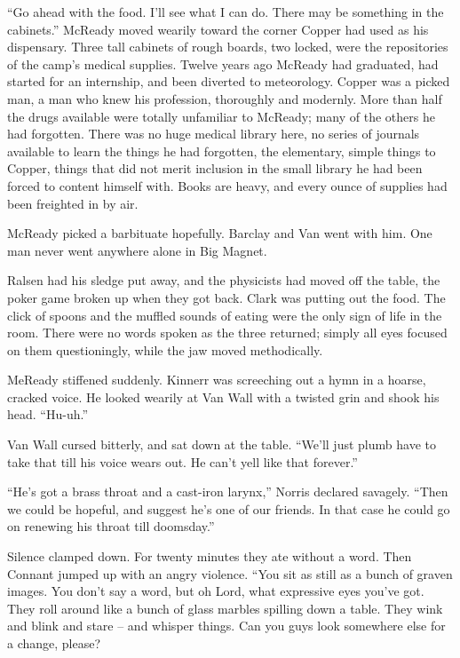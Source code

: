 \documentclass[letterpaper,openany,12pt]{memoir}		%
\begin{document}
``Go ahead with the food. I'll see what I can do. There may be something in the
cabinets.'' McReady moved wearily toward the corner Copper had used as his
dispensary. Three tall cabinets of rough boards, two locked, were the
repositories of the camp's medical supplies. Twelve years ago McReady had
graduated, had started for an internship, and been diverted to meteorology.
Copper was a picked man, a man who knew his profession, thoroughly and modernly.
More than half the drugs available were totally unfamiliar to McReady; many of
the others he had forgotten. There was no huge medical library here, no series
of journals available to learn the things he had forgotten, the elementary,
simple things to Copper, things that did not merit inclusion in the small
library he had been forced to content himself with. Books are heavy, and every
ounce of supplies had been freighted in by air.

McReady picked a barbituate hopefully. Barclay and Van went with him. One man
never went anywhere alone in Big Magnet.

Ralsen had his sledge put away, and the physicists had moved off the table, the
poker game broken up when they got back. Clark was putting out the food. The
click of spoons and the muffled sounds of eating were the only sign of life in
the room. There were no words spoken as the three returned; simply all eyes
focused on them questioningly, while the jaw moved methodically.

MeReady stiffened suddenly. Kinnerr was screeching out a hymn in a hoarse,
cracked voice. He looked wearily at Van Wall with a twisted grin and shook his
head. ``Hu-uh.''

Van Wall cursed bitterly, and sat down at the table. ``We'll just plumb have to
take that till his voice wears out. He can't yell like that forever.''

``He's got a brass throat and a cast-iron larynx,'' Norris declared savagely.
``Then we could be hopeful, and suggest he's one of our friends. In that case he
could go on renewing his throat till doomsday.''

Silence clamped down. For twenty minutes they ate without a word. Then Connant
jumped up with an angry violence. ``You sit as still as a bunch of graven
images. You don't say a word, but oh Lord, what expressive eyes you've got. They
roll around like a bunch of glass marbles spilling down a table. They wink and
blink and stare -- and whisper things. Can you guys look somewhere else for a
change, please?
\end{document}
